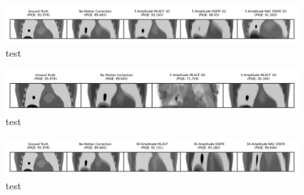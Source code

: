             \begin{figure}
                \centering
                
                \includegraphics[width=1.0\linewidth]{figures/motion_correction_2_results_2_noiseless_5_amplitude_visual_analysis.png}
                
                \captionsetup{singlelinecheck=false}
                \caption{
                    test
                }
                
                \label{fig:test_noiseless_5_amplitude_visual_analysis}
            \end{figure}

            \begin{figure}
                \centering
                
                \includegraphics[width=1.0\linewidth]{figures/motion_correction_2_results_2_noiseless_1d_vs_2d_visual_analysis.png}
                
                \captionsetup{singlelinecheck=false}
                \caption{
                    test
                }
                
                \label{fig:test_noiseless_1d_vs_2d_visual_analysis}
            \end{figure}

            \begin{figure}
                \centering
                
                \includegraphics[width=1.0\linewidth]{figures/motion_correction_2_results_2_noiseless_30_amplitude_visual_analysis.png}
                
                \captionsetup{singlelinecheck=false}
                \caption{
                    test
                }
                
                \label{fig:test_noiseless_30_amplitude_visual_analysis}
            \end{figure}


